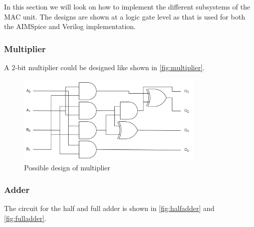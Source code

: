 In this section we will look on how to implement the different subsystems of the MAC unit. The designs are shown at a logic gate level as that is used for both the AIMSpice and Verilog implementation. 

\subsubsection{Multiplier} 

A 2-bit multiplier could be designed like shown in \autoref{fig:multiplier}.

\begin{figure}[H]
    \centering
    \includegraphics[width=0.8\textwidth]{Figures/multiplier.png}
    \caption{Possible design of multiplier}
    \label{fig:multiplier}
\end{figure}

\subsubsection{Adder}
The circuit for the half and full adder is shown in \autoref{fig:halfadder} and \ref{fig:fulladder}.

